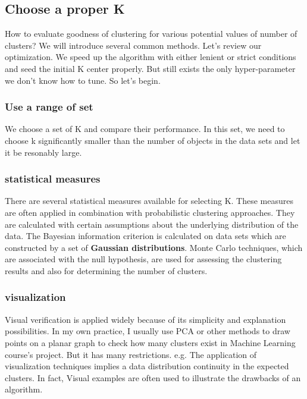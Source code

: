 \documentclass[11pt]{article}
\begin{document}
\subsection{Choose a proper K}
How to evaluate goodness of clustering for various potential values of number of clusters? We will introduce several common methods.\cite{datamining,inproceedings,articleToBound,doi:10.1243/095440605X8298} Let's review our optimization. We speed up the algorithm with either lenient or strict conditions and seed the initial K center properly. But still exists the only hyper-parameter we don't know how to tune. So let's begin. \par


\subsubsection{Use a range of set}
We choose a set of K and compare their performance. In this set, we need to choose k significantly smaller than the number of objects in the data sets and let it be resonably large.

\subsubsection{statistical measures}
There are several statistical measures available for selecting K. These measures are often applied in combination with probabilistic clustering approaches.
They are calculated with certain assumptions about the underlying distribution of the data. The Bayesian information criterion is calculated on data sets which are constructed by a set of \textbf{Gaussian distributions}. Monte Carlo techniques, which are associated with the null hypothesis, are used for assessing the clustering results and also for determining the number of clusters.

\subsubsection{visualization}
Visual verification is applied widely because of its simplicity and explanation possibilities. In my own practice, I usually use PCA or other methods to draw points on a planar graph to check how many clusters exist in Machine Learning course's project. But it has many restrictions. e.g. The application of
visualization techniques implies a data distribution continuity in the expected clusters. In fact, Visual examples are often used to illustrate the drawbacks of an algorithm. \par
\end{document}
